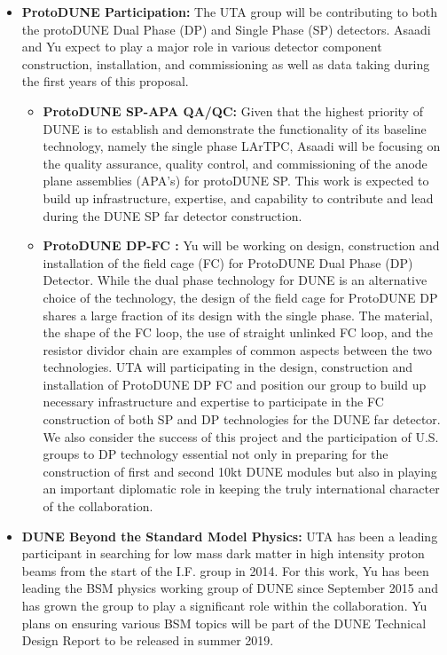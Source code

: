 \begin{itemize}

\item {{\bf ProtoDUNE Participation:} The UTA group will be contributing to both the protoDUNE Dual Phase (DP) and Single Phase (SP) detectors. Asaadi and Yu expect to play a major role in various detector component construction, installation, and commissioning as well as data taking during the first years of this proposal.}

\begin{itemize}
\item {{\bf ProtoDUNE SP-APA QA/QC:} Given that the highest priority of DUNE is to establish and demonstrate the functionality of its baseline technology, namely the single phase LArTPC, Asaadi will be focusing on the quality assurance, quality control, and commissioning of the anode plane assemblies (APA's) for protoDUNE SP. This work is expected to build up infrastructure, expertise, and capability to contribute and lead during the DUNE SP far detector construction.}

\item {{\bf ProtoDUNE DP-FC :} Yu will be working on design, construction and installation of the field cage (FC) for ProtoDUNE Dual Phase (DP) Detector. While the dual phase technology for DUNE is an alternative choice of the technology, the design of the field cage for ProtoDUNE DP shares a large fraction of its design with the single phase. The material, the shape of the FC loop, the use of straight unlinked FC loop, and the resistor dividor chain are examples of common aspects between the two technologies.  UTA will participating in the design, construction and installation of ProtoDUNE DP FC and position our group to build up necessary infrastructure and expertise to participate in the FC construction of both SP and DP technologies for the DUNE far detector.  We also consider the success of this project and the participation of U.S. groups to DP technology essential not only in preparing for the construction of first and second 10kt DUNE modules but also in playing an important diplomatic role in keeping the truly international character of the collaboration.}

\end{itemize}

\item {{\bf DUNE Beyond the Standard Model Physics:} UTA has been a leading participant in searching for low mass dark matter in high intensity proton beams from the start of the I.F. group in 2014.   For this work, Yu has been leading the BSM physics working group of DUNE since September 2015 and has grown the group to play a significant role within the collaboration.   Yu plans on ensuring various BSM topics will be part of the DUNE Technical Design Report to be released in summer 2019.}



\end{itemize}
